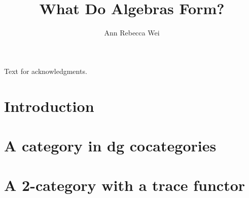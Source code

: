 \documentclass[12pt]{nuthesis} %
\author{Ann Rebecca Wei}
\title{What Do Algebras Form?}
\theoremstyle{definition}
\theoremstyle{remark}
\theoremstyle{example}
\begin{document}

\frontmatter		%
\maketitle		%

\abstract		%


\acknowledgements	%
Text for acknowledgments.




\nomenclature %


%
%
\clearpage{} %





\mainmatter             %

\chapter{Introduction}
	

\chapter{A category in dg cocategories}
	
	
	

\chapter{A 2-category with a trace functor}
	
	
	
\end{document}
